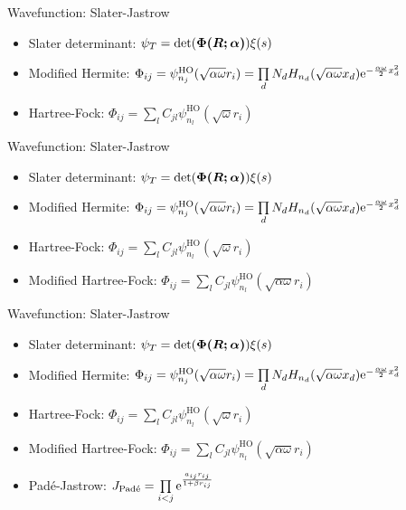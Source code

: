 \documentclass[10pt, t, xcolor=dvipsnames]{beamer}
\begin{document}
{{{{{\begin{frame}[fragile]{Wavefunction: Slater-Jastrow}
    \begin{itemize}
        \item Slater determinant: $\psi_T =
            \det(\bm{{\Phi(\bm{{R}};\bm{{\alpha}})}}) \xi(s)$
        \item Modified Hermite: $\Phi_{ij} =
            \psi^{\text{HO}}_{n_j}(\sqrt{\alpha\omega}r_i) = \prod\limits_d N_d
            H_{n_d}(\sqrt{\alpha \omega}x_d)\mathrm{e}^{-\frac{\alpha\omega}{2}x^2_d}$
        \item Hartree-Fock: $\Phi_{ij} =
            \sum\limits_lC_{jl}\psi^{\text{HO}}_{n_l}\left(\sqrt{\omega}r_i\right)$
    \end{itemize}
\end{frame}

\begin{frame}[fragile]{Wavefunction: Slater-Jastrow}
    \begin{itemize}
        \item Slater determinant: $\psi_T =
            \det(\bm{{\Phi(\bm{{R}};\bm{{\alpha}})}}) \xi(s)$
        \item Modified Hermite: $\Phi_{ij} =
            \psi^{\text{HO}}_{n_j}(\sqrt{\alpha\omega}r_i) = \prod\limits_d N_d
            H_{n_d}(\sqrt{\alpha \omega}x_d)\mathrm{e}^{-\frac{\alpha\omega}{2}x^2_d}$
        \item Hartree-Fock: $\Phi_{ij} =
            \sum\limits_lC_{jl}\psi^{\text{HO}}_{n_l}\left(\sqrt{\omega}r_i\right)$
        \item Modified Hartree-Fock: $\Phi_{ij} =
            \sum\limits_lC_{jl}\psi^{\text{HO}}_{n_l}\left(\sqrt{\alpha\omega}r_i\right)$
    \end{itemize}
\end{frame}

\begin{frame}[fragile]{Wavefunction: Slater-Jastrow}
    \begin{itemize}
        \item Slater determinant: $\psi_T =
            \det(\bm{{\Phi(\bm{{R}};\bm{{\alpha}})}}) \xi(s)$
        \item Modified Hermite: $\Phi_{ij} =
            \psi^{\text{HO}}_{n_j}(\sqrt{\alpha\omega}r_i) = \prod\limits_d N_d
            H_{n_d}(\sqrt{\alpha \omega}x_d)\mathrm{e}^{-\frac{\alpha\omega}{2}x^2_d}$
        \item Hartree-Fock: $\Phi_{ij} =
            \sum\limits_lC_{jl}\psi^{\text{HO}}_{n_l}\left(\sqrt{\omega}r_i\right)$
        \item Modified Hartree-Fock: $\Phi_{ij} =
            \sum\limits_lC_{jl}\psi^{\text{HO}}_{n_l}\left(\sqrt{\alpha\omega}r_i\right)$
        \item Pad\'e-Jastrow: $J_{\text{Pad\'e}} = \prod\limits_{i<j}
            \mathrm{e}^{\frac{a_{ij} r_{ij}}{1 + \beta r_{ij}}}$
    \end{itemize}
\end{frame}

}}}}}
\end{document}
